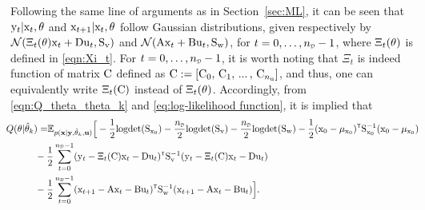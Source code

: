 Following the same line of arguments as in Section~\ref{sec:ML}, it can be seen that ${ \mathrm{y} }_t|{ \mathrm{x} }_t,{ \mathrm{\theta} }$ and ${ \mathrm{x} }_{t+1}|{ \mathrm{x} }_t,{ \mathrm{\theta} }$ follow Gaussian distributions, given respectively by $\mathcal{N}(\Xi_t({ \mathrm{\theta} }) { \mathrm{x} }_t + { \mathrm{D} } { \mathrm{u} }_t, { \mathrm{S} }_{ \mathrm{v} })$ and $\mathcal{N}({ \mathrm{A} } { \mathrm{x} }_t + { \mathrm{B} } { \mathrm{u} }_t, { \mathrm{S} }_{ \mathrm{w} })$, for $t=0,\ldots,\nD-1$, where $\Xi_t({ \mathrm{\theta} })$ is defined in \eqref{eqn:Xi_t}. 
For $t=0,\ldots,\nD-1$, 
it is worth noting that $\Xi_t$ is indeed function of matrix ${ \mathrm{C} }$ defined as ${ \mathrm{C} } := [{ \mathrm{C} }_0,\, { \mathrm{C} }_1,\, ... \,,\,{{ \mathrm{C} }}_{n_{ \mathrm{u} }}]$, and thus, one can equivalently write $\Xi_t({ \mathrm{C} })$ instead of $\Xi_t({ \mathrm{\theta} })$.
Accordingly, from \eqref{eqn:Q_theta_theta_k} and \eqref{eq:log-likelihood function}, it is implied that
\begin{equation}\label{eq:Q function}
    \begin{split}\!\!\!
        Q(\vctheta|\hat{\vctheta}_k) = &\mathbb{E}_{p(\mathbf{x}|\mathbf{y},\hat{\vctheta}_k,\mathbf{u})}
        \Big[
        -\frac{1}{2}   \logdet(\mxS_{\vcx_0}) 
        -\frac{\nD}{2} \logdet(\mxS_\vcv) 
        -\frac{\nD}{2} \logdet(\mxS_\vcw) 
        -\frac{1}{2}(\vcx_0-\vcmu_{\vcx_0})^\tr \mxS_{\vcx_0}^{-1} (\vcx_0-\vcmu_{\vcx_0})
        \\
        & \!\!\!\! \!\!\!\! 
        -\frac{1}{2} \sum_{t=0}^{\nD-1} (\vcy_t - \Xi_t(\mxC) \vcx_t - \mxD \vcu_t)^\tr \mxS_\vcv^{-1} (\vcy_t - \Xi_t(\mxC) \vcx_t - \mxD \vcu_t) 
         \\
        & \!\!\!\! \!\!\!\! 
        -\frac{1}{2} \sum_{t=0}^{\nD-1} (\vcx_{t+1} - \mxA \vcx_t - \mxB \vcu_t)^\tr \mxS_\vcw^{-1} (\vcx_{t+1} - \mxA \vcx_t - \mxB \vcu_t) 
        \Big].
    \end{split}\!\!\!\!
\end{equation}
